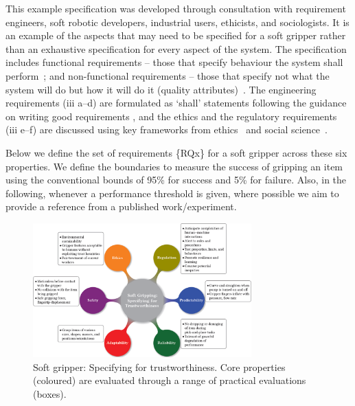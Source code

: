 \documentclass[letterpaper, 10 pt, conference]{ieeeconf}  %
\begin{document}
	This example specification was developed through consultation with requirement engineers, soft robotic developers, industrial users, ethicists, and sociologists. It is an example of the aspects that may need to be specified for a soft gripper rather than an exhaustive specification for every aspect of the system. 
	The specification includes functional requirements -- those that specify behaviour the system shall perform~\cite{ISO24765:2017}; and non-functional requirements -- those that specify not what the system will do but how it will do it (quality attributes)~\cite{ISO24765:2017}.
	The engineering requirements (iii a--d) are formulated as `shall' statements following the guidance on writing good requirements \cite{NASA2007}, and the ethics and the regulatory requirements (iii e--f) are discussed using key frameworks from ethics~\cite{Porter2023} and social science~\cite{Macrae2022}. 
	
	Below we define the set of requirements \{RQx\} for a soft gripper across these six properties.
	We define the boundaries to measure the success of gripping an item using the conventional bounds of 95\% for success and 5\% for failure. 
	Also, in the following, whenever a performance threshold is given, where possible we aim to provide a reference from a published work/experiment. 
	\begin{figure}
		\centering
		\includegraphics[width=0.75\textwidth]{figures/properties}%
		\caption{Soft gripper: Specifying for trustworthiness. Core properties (coloured) are evaluated through a range of practical evaluations (boxes). }
		\label{SR-spec}
	\end{figure}
	
\end{document}
